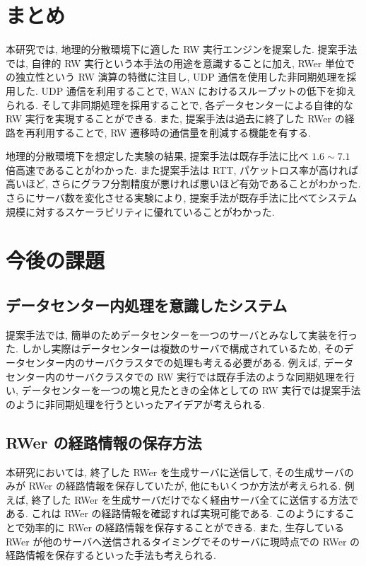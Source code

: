\section{まとめ}

本研究では, 地理的分散環境下に適した RW 実行エンジンを提案した. 提案手法では, 自律的 RW 実行という本手法の用途を意識することに加え, RWer 単位での独立性という RW 演算の特徴に注目し, UDP 通信を使用した非同期処理を採用した. UDP 通信を利用することで, WAN におけるスループットの低下を抑えられる. そして非同期処理を採用することで, 各データセンターによる自律的な RW 実行を実現することができる. また, 提案手法は過去に終了した RWer の経路を再利用することで, RW 遷移時の通信量を削減する機能を有する. 

地理的分散環境下を想定した実験の結果, 提案手法は既存手法に比べ $1.6 \sim 7.1$ 倍高速であることがわかった. また提案手法は RTT, パケットロス率が高ければ高いほど, さらにグラフ分割精度が悪ければ悪いほど有効であることがわかった. さらにサーバ数を変化させる実験により, 提案手法が既存手法に比べてシステム規模に対するスケーラビリティに優れていることがわかった. 

\section{今後の課題}

\subsection{データセンター内処理を意識したシステム}

提案手法では, 簡単のためデータセンターを一つのサーバとみなして実装を行った. しかし実際はデータセンターは複数のサーバで構成されているため, そのデータセンター内のサーバクラスタでの処理も考える必要がある. 例えば, データセンター内のサーバクラスタでの RW 実行では既存手法のような同期処理を行い, データセンターを一つの塊と見たときの全体としての RW 実行では提案手法のように非同期処理を行うといったアイデアが考えられる. 

\subsection{RWer の経路情報の保存方法}

本研究においては, 終了した RWer を生成サーバに送信して, その生成サーバのみが RWer の経路情報を保存していたが, 他にもいくつか方法が考えられる. 例えば, 終了した RWer を生成サーバだけでなく経由サーバ全てに送信する方法である. これは RWer の経路情報を確認すれば実現可能である. このようにすることで効率的に RWer の経路情報を保存することができる. また, 生存している RWer が他のサーバへ送信されるタイミングでそのサーバに現時点での RWer の経路情報を保存するといった手法も考えられる. 